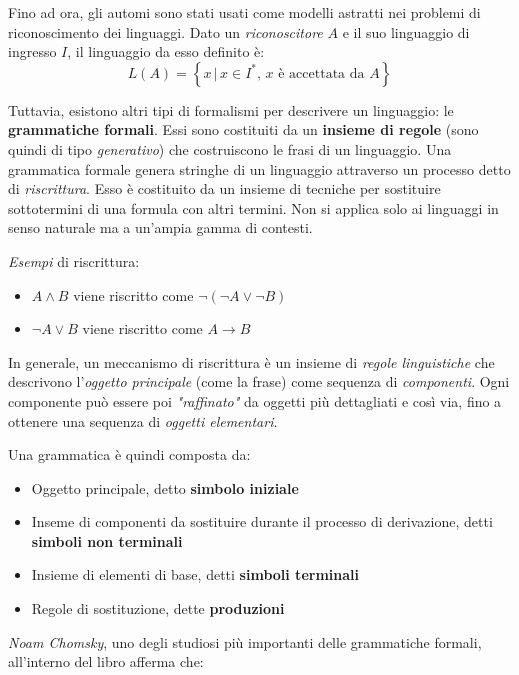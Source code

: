 \documentclass[italian, 10pt]{article}
\begin{document}
Fino ad ora, gli automi sono stati usati come modelli astratti nei problemi di riconoscimento dei linguaggi.
Dato un \textit{riconoscitore} \(A\) e il suo linguaggio di ingresso \(I\), il linguaggio da esso definito è:
\[ L(A) = \left\{x \, | \, x \in I^\ast, \, x \text{ è accettata da } A \right\} \]

Tuttavia, esistono altri tipi di formalismi per descrivere un linguaggio: le \textbf{grammatiche formali}.
Essi sono costituiti da un \textbf{insieme di regole} (sono quindi di tipo \textit{generativo}) che costruiscono le frasi di un linguaggio.
Una grammatica formale genera stringhe di un linguaggio attraverso un processo detto di \textit{riscrittura}.
Esso è costituito da un insieme di tecniche per sostituire sottotermini di una formula con altri termini.
Non si applica solo ai linguaggi in senso naturale ma a un'ampia gamma di contesti.

\bigskip
\textit{Esempi} di riscrittura:

\begin{itemize}
  \item \(A \land B\) viene riscritto come \(\lnot (\lnot A \lor \lnot B)\)
  \item \(\lnot A \lor B\) viene riscritto come \(A \rightarrow B\)
\end{itemize}

\bigskip
In generale, un meccanismo di riscrittura è un insieme di \textit{regole linguistiche} che descrivono l'\textit{oggetto principale} (come la frase) come sequenza di \textit{componenti}.
Ogni componente può essere poi \textit{"raffinato"} da oggetti più dettagliati e così via, fino a ottenere una sequenza di \textit{oggetti elementari}.

Una grammatica è quindi composta da:

\begin{itemize}
  \item Oggetto principale, detto \textbf{simbolo iniziale}
  \item Inseme di componenti da sostituire durante il processo di derivazione, detti \textbf{simboli non terminali}
  \item Insieme di elementi di base, detti \textbf{simboli terminali}
  \item Regole di sostituzione, dette \textbf{produzioni}
\end{itemize}

\bigskip

\textit{Noam Chomsky}, uno degli studiosi più importanti delle grammatiche formali, all'interno del libro  afferma che:
\end{document}
